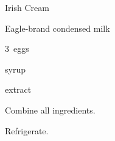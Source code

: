 \begin{recipe}{Irish Cream}{}{}

\begin{ingredients}
\item {} Eagle-brand condensed milk
\item 3~eggs
\item {}  syrup
\item \tp{\half}  extract
\item {} 
\end{ingredients}

\begin{directions}
\item Combine all ingredients.
\item Refrigerate.
\end{directions}

\end{recipe}
